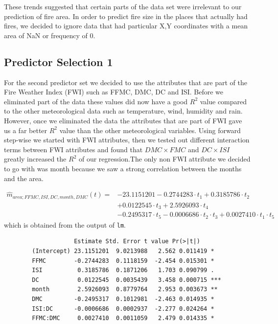 \documentclass{article}
\begin{document}
These trends suggested that certain parts of the data set were irrelevant to our prediction of
fire area. In order to predict fire size in the places that actually had fires, we decided to
ignore data that had particular X,Y coordinates with a mean area of NaN or frequency of 0.

\subsection{Predictor Selection 1}

For the second predictor set we decided to use the attributes that are part of the Fire Weather Index (FWI) such as FFMC, DMC, DC and ISI. 
Before we eliminated part of the data these values did now have a good $R^{2}$ value compared to the other meteorological data such as temperature, wind, humidity and rain. 
However, once we eliminated the data the attributes that are part of FWI gave us a far better $R^{2}$ value than the other meteorological variables. 
Using forward step-wise we started with FWI attributes, then we tested out different interaction terms between FWI attributes and found that $DMC \times FMC$  and $DC \times ISI$ greatly increased the $R^{2}$ of our regression.The only non FWI attribute we decided to go with was month because we saw a strong correlation between the months and the area.

\begin{align*}
  \widehat{m}_{area;FFMC,ISI,DC,month,DMC}(t) = &-23.1151201 - 0.2744283 \cdot t_1 + 0.3185786 \cdot t_2 \\
  &+ 0.0122545 \cdot t_3 + 2.5926093 \cdot t_4 \\
  &- 0.2495317 \cdot t_5 - 0.0006686 \cdot t_2 \cdot t_3 + 0.0027410 \cdot t_1 \cdot t_5 	   
\end{align*}
which is obtained from the output of \verb=lm=.

\begin{verbatim}
              		Estimate Std. Error t value Pr(>|t|)    
		(Intercept) 23.1151201  9.0213988   2.562 0.011419 *  
		FFMC        -0.2744283  0.1118159  -2.454 0.015301 *  
		ISI          0.3185786  0.1871206   1.703 0.090799 .  
		DC           0.0122545  0.0035439   3.458 0.000715 ***
		month        2.5926093  0.8779764   2.953 0.003673 ** 
		DMC         -0.2495317  0.1012981  -2.463 0.014935 *  
		ISI:DC      -0.0006686  0.0002937  -2.277 0.024264 *  
		FFMC:DMC     0.0027410  0.0011059   2.479 0.014335 *
\end{verbatim}
\end{document}
